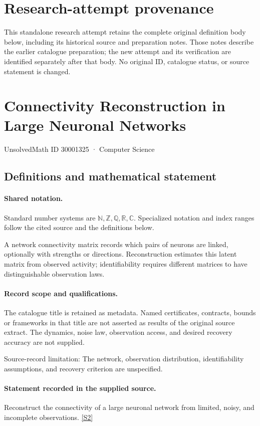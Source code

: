 \documentclass[11pt]{article}
\begin{document}
\section*{Research-attempt provenance}
This standalone research attempt retains the complete original definition body below,
including its historical source and preparation notes. Those notes describe the
earlier catalogue preparation; the new attempt and its verification are identified
separately after that body. No original ID, catalogue status, or source statement is changed.

\section{Connectivity Reconstruction in Large Neuronal Networks}\label{30001325}
{\small UnsolvedMath ID 30001325 · Computer Science}
\subsection{Definitions and mathematical statement}

\paragraph{Shared notation.}Standard number systems are $\mathbb N,\mathbb Z,\mathbb Q,\mathbb R,\mathbb C$. Specialized notation and index ranges follow the cited source and the definitions below.


A network connectivity matrix records which pairs of neurons are linked, optionally with strengths or directions. Reconstruction estimates this latent matrix from observed activity; identifiability requires different matrices to have distinguishable observation laws.
\paragraph{Record scope and qualifications.}
The catalogue title is retained as metadata. Named certificates, contracts, bounds or frameworks in that title are not asserted as results of the original source extract.
The dynamics, noise law, observation access, and desired recovery accuracy are not supplied.

Source-record limitation: The network, observation distribution, identifiability assumptions, and recovery criterion are unspecified.
\paragraph{Statement recorded in the supplied source.}
Reconstruct the connectivity of a large neuronal network from limited, noisy, and incomplete observations. \href{https://doi.org/10.4171/owr/2009/39}{[S2]}
\end{document}
